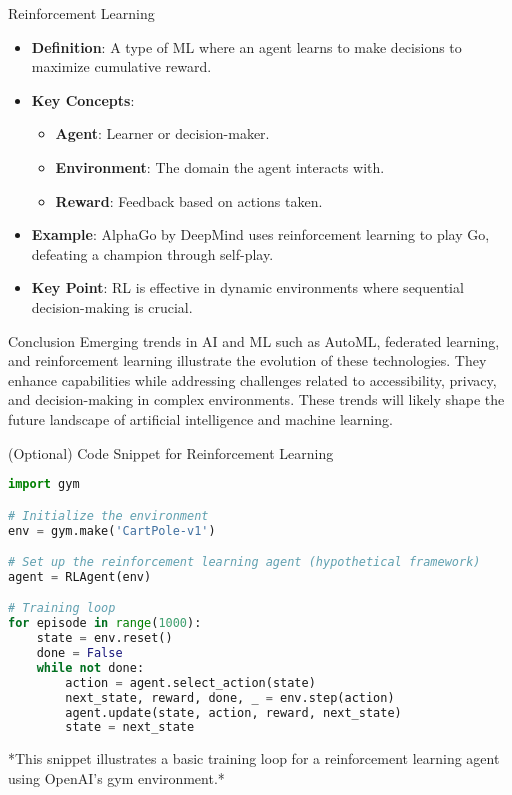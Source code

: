 \documentclass[aspectratio=169]{beamer}
\begin{document}
\begin{frame}{Reinforcement Learning}
    \begin{itemize}
        \item \textbf{Definition}: A type of ML where an agent learns to make decisions to maximize cumulative reward.
        \item \textbf{Key Concepts}:
        \begin{itemize}
            \item \textbf{Agent}: Learner or decision-maker.
            \item \textbf{Environment}: The domain the agent interacts with.
            \item \textbf{Reward}: Feedback based on actions taken.
        \end{itemize}
        \item \textbf{Example}: AlphaGo by DeepMind uses reinforcement learning to play Go, defeating a champion through self-play.
        \item \textbf{Key Point}: RL is effective in dynamic environments where sequential decision-making is crucial.
    \end{itemize}
\end{frame}

\begin{frame}{Conclusion}
    Emerging trends in AI and ML such as AutoML, federated learning, and reinforcement learning illustrate the evolution of these technologies. 
    They enhance capabilities while addressing challenges related to accessibility, privacy, and decision-making in complex environments. 
    These trends will likely shape the future landscape of artificial intelligence and machine learning.
\end{frame}

\begin{frame}[fragile]{(Optional) Code Snippet for Reinforcement Learning}
\begin{lstlisting}[language=Python]
import gym

# Initialize the environment
env = gym.make('CartPole-v1')

# Set up the reinforcement learning agent (hypothetical framework)
agent = RLAgent(env)

# Training loop
for episode in range(1000):
    state = env.reset()
    done = False
    while not done:
        action = agent.select_action(state)
        next_state, reward, done, _ = env.step(action)
        agent.update(state, action, reward, next_state)
        state = next_state
\end{lstlisting}
*This snippet illustrates a basic training loop for a reinforcement learning agent using OpenAI's gym environment.*
\end{frame}
\end{document}
